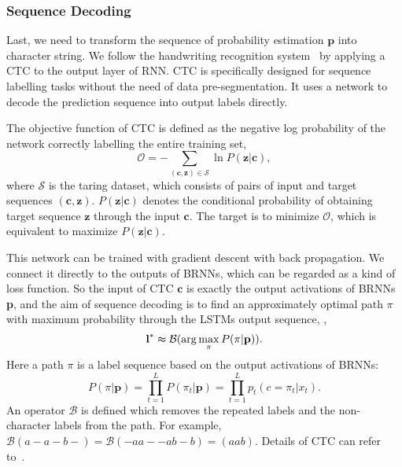 \documentclass[twocolumn]{svjour3}
\begin{document}
\subsubsection{Sequence Decoding}Last, we need to transform the sequence of probability estimation $\textbf{p}$ into character string. We follow the handwriting recognition system~\cite{Graves2009Pami} by applying a CTC to the output layer of RNN. CTC is specifically designed for sequence labelling tasks without the need of data pre-segmentation. It uses a network to decode the prediction sequence into output labels directly.

The objective function of CTC is defined as the negative log probability of the network correctly labelling the entire training set, \ie\begin{equation}
\mathcal{O}=-\sum_{(\textbf{c},\textbf{z}) \in \mathcal{S}} \ln P(\textbf{z} | \textbf{c}),
\end{equation}
where $\mathcal{S}$ is the taring dataset, which consists of pairs of input and target sequences $(\textbf{c}, \textbf{z})$. $P(\textbf{z} | \textbf{c})$ denotes the conditional probability of obtaining target sequence $\textbf{z}$ through the input $\textbf{c}$. The target is to minimize $\mathcal{O}$, which is equivalent to maximize $P(\textbf{z} | \textbf{c})$.

This network can be trained with gradient descent with back propagation.  We connect it directly to the outputs of BRNNs, which can be regarded as a kind of loss function. So the input of CTC $\textbf{c}$ is exactly the output activations of BRNNs \textbf{p},
and the aim of sequence decoding is to find an approximately optimal path $\pi$ with maximum probability through the LSTMs output sequence, \ie,
\begin{equation}
\textbf{l}^* \thickapprox \mathcal{B}(\arg \max_{\pi} P(\pi | \textbf{p})).
\end{equation}
Here a path $\pi$ is a label sequence based on the output activations of BRNNs:
\begin{equation}
P(\pi | \textbf{p}) = \prod_{t=1}^{L}P(\pi_t|\textbf{p}) =\prod_{t=1}^{L} p_t(c=\pi_t|x_t).
\end{equation}
An operator $\mathcal{B}$ is defined which removes the repeated labels and the non-character labels from the path. For example, $\mathcal{B}(a-a-b-)=\mathcal{B}(-aa--ab-b)=(aab)$.
Details of CTC can refer to~\cite{Graves2006ICML,Graves2009Pami}.
\end{document}
